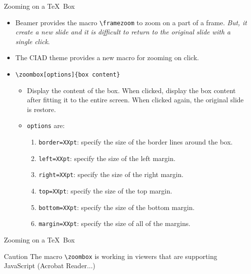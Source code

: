 \documentclass[english,sectioncirclenumberstyle]{ciadbeamer}
\begin{document}
\begin{frame}[t]{Zooming on a \TeX\ Box}
	\begin{itemize}
	\item Beamer provides the macro \texttt{{\textbackslash}framezoom} to zoom on a part of a frame. \emph{But, it create a new slide and it is difficult to return to the original slide with a single click}.	
	\item The CIAD theme provides a new macro for zooming on click.
	\item \texttt{{\textbackslash}zoombox[options]\{box content\}}
		\begin{itemize}
		\item Display the content of the box. When clicked, display the box content after fitting it to the entire screen. When clicked again, the original slide is restore.
		\item \texttt{options} are:
			\begin{enumerate}
			\item \texttt{border=XXpt}: specify the size of the border lines around the box.
			\item \texttt{left=XXpt}: specify the size of the left margin.
			\item \texttt{right=XXpt}: specify the size of the right margin.
			\item \texttt{top=XXpt}: specify the size of the top margin.
			\item \texttt{bottom=XXpt}: specify the size of the bottom margin.
			\item \texttt{margin=XXpt}: specify the size of all of the margins.
			\end{enumerate}
		\end{itemize}
	\end{itemize}
\end{frame}

\begin{frame}[t]{Zooming on a \TeX\ Box \insertcontinuationtext}
	\begin{alertblock}{Caution}
	The macro \texttt{{\textbackslash}zoombox} is working in viewers that are supporting JavaScript (Acrobat Reader...)
	\end{alertblock}
	\vspace{1em}
	\begin{center}
	\end{center}
\end{frame}
\end{document}
